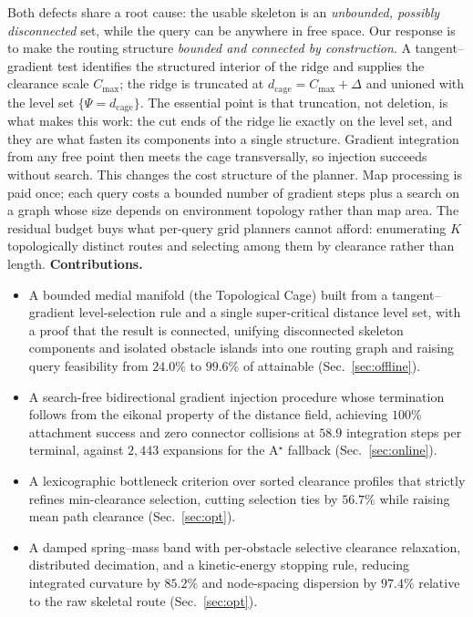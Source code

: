 \documentclass[conference]{IEEEtran}
\begin{document}
Both defects share a root cause: the usable skeleton is an \emph{unbounded, possibly disconnected} set, while the query can be anywhere in free space. Our response is to make the routing structure \emph{bounded and connected by construction}. A tangent--gradient test identifies the structured interior of the ridge and supplies the clearance scale $C_{\max}$; the ridge is truncated at $d_{\mathrm{cage}}=C_{\max}+\Delta$ and unioned with the level set $\{\Psi=d_{\mathrm{cage}}\}$. The essential point is that truncation, not deletion, is what makes this work: the cut ends of the ridge lie exactly on the level set, and they are what fasten its components into a single structure. Gradient integration from any free point then meets the cage transversally, so injection succeeds without search.
This changes the cost structure of the planner. Map processing is paid once; each query costs a bounded number of gradient steps plus a search on a graph whose size depends on environment topology rather than map area. The residual budget buys what per-query grid planners cannot afford: enumerating $K$ topologically distinct routes and selecting among them by clearance rather than length.
\textbf{Contributions.}
\begin{itemize}
  \item A bounded medial manifold (the Topological Cage) built from a tangent--gradient level-selection rule and a single super-critical distance level set, with a proof that the result is connected, unifying disconnected skeleton components and isolated obstacle islands into one routing graph and raising query feasibility from $24.0\%$ to $99.6\%$ of attainable (Sec.~\ref{sec:offline}).
  \item A search-free bidirectional gradient injection procedure whose termination follows from the eikonal property of the distance field, achieving $100\%$ attachment success and zero connector collisions at $58.9$ integration steps per terminal, against $2{,}443$ expansions for the A$^\star$ fallback (Sec.~\ref{sec:online}).
  \item A lexicographic bottleneck criterion over sorted clearance profiles that strictly refines min-clearance selection, cutting selection ties by $56.7\%$ while raising mean path clearance (Sec.~\ref{sec:opt}).
  \item A damped spring--mass band with per-obstacle selective clearance relaxation, distributed decimation, and a kinetic-energy stopping rule, reducing integrated curvature by $85.2\%$ and node-spacing dispersion by $97.4\%$ relative to the raw skeletal route (Sec.~\ref{sec:opt}).
\end{itemize}
\end{document}
